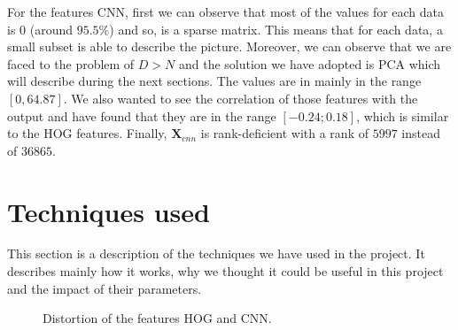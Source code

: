 \documentclass{article} %
\begin{document}
For the features CNN, first we can observe that most of the values for each data is $0$ (around $95.5\%$) and so, is a sparse matrix. This means that for each data, a small subset is able to describe the picture. Moreover, we can observe that we are faced to the problem of $D > N$ and the solution we have adopted is PCA which will describe during the next sections. The values are in mainly in the range $[0, 64.87]$. We also wanted to see the correlation of those features with the output and have found that they are in the range $[-0.24;0.18]$, which is similar to the HOG features. Finally,  $\mathbf{X}_{cnn}$ is rank-deficient with a rank of $5997$ instead of $36865$.

\section{Techniques used}

This section is a description of the techniques we have used in the project. It describes mainly how it works, why we thought it could be useful in this project and the impact of their parameters.

\begin{figure}[!ht]
\center
{}
\hfill
{}
\hfill
\caption{Distortion of the features HOG and CNN.}
\end{figure}
\end{document}
